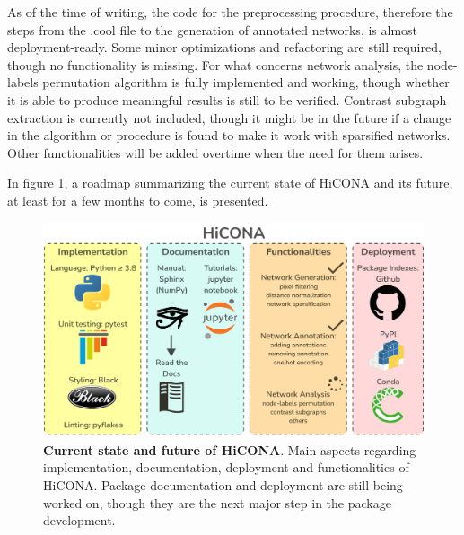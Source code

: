 As of the time of writing, the code for the preprocessing procedure, therefore the steps from the .cool file to the generation of annotated networks, is almost deployment-ready. Some minor optimizations and refactoring are still required, though no functionality is missing. For what concerns network analysis, the node-labels permutation algorithm is fully implemented and working, though whether it is able to produce meaningful results is still to be verified. Contrast subgraph extraction is currently not included, though it might be in the future if a change in the algorithm or procedure is found to make it work with sparsified networks. Other functionalities will be added overtime when the need for them arises.

In figure \ref{fig:roadmap}, a roadmap summarizing the current state of HiCONA and its future, at least for a few months to come, is presented.

\begin{figure}[H]
  \centering
  \includegraphics[width=1\textwidth]{roadmap.png}
  \caption{\textbf{Current state and future of HiCONA}. Main aspects regarding implementation, documentation, deployment and functionalities of HiCONA. Package documentation and deployment are still being worked on, though they are the next major step in the package development.}
  \label{fig:roadmap}
\end{figure}
